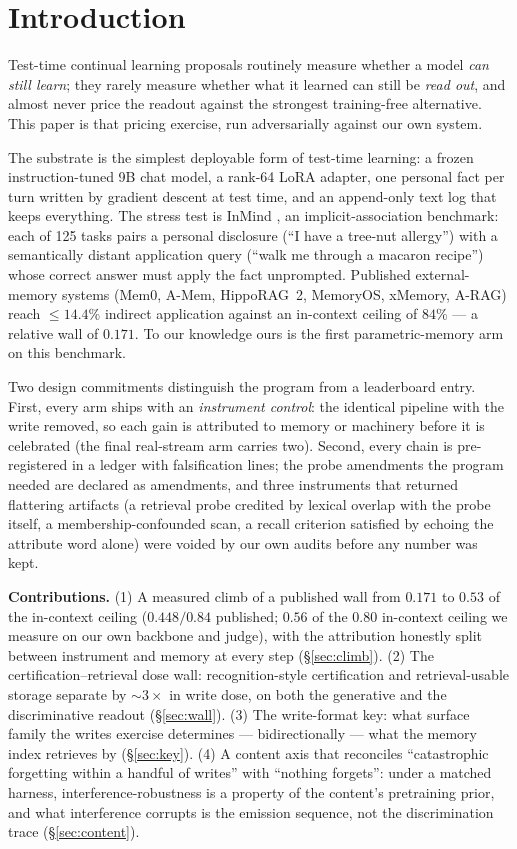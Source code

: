 \documentclass{article}
\begin{document}
\section{Introduction}

Test-time continual learning proposals routinely measure whether a model \emph{can still
learn}; they rarely measure whether what it learned can still be \emph{read out}, and almost
never price the readout against the strongest training-free alternative. This paper is that
pricing exercise, run adversarially against our own system.

The substrate is the simplest deployable form of test-time learning: a frozen
instruction-tuned 9B chat model, a rank-64 LoRA adapter, one personal fact per turn written
by gradient descent at test time, and an append-only text log that keeps everything. The
stress test is InMind \citep{inmind2026}, an implicit-association benchmark: each of 125
tasks pairs a personal disclosure (``I have a tree-nut allergy'') with a semantically
distant application query (``walk me through a macaron recipe'') whose correct answer must
apply the fact unprompted. Published external-memory systems (Mem0, A-Mem, HippoRAG~2,
MemoryOS, xMemory, A-RAG) reach $\le 14.4\%$ indirect application against an in-context
ceiling of $84\%$ --- a relative wall of $0.171$. To our knowledge ours is the first
parametric-memory arm on this benchmark.

Two design commitments distinguish the program from a leaderboard entry. First, every arm
ships with an \emph{instrument control}: the identical pipeline with the write removed, so
each gain is attributed to memory or machinery before it is celebrated (the final
real-stream arm carries two). Second, every chain is pre-registered in a ledger with falsification lines;
the probe amendments the program needed are declared as amendments, and three instruments
that returned flattering artifacts (a retrieval probe credited by lexical overlap with the
probe itself, a membership-confounded scan, a recall criterion satisfied by echoing the
attribute word alone) were voided by our own audits before any number was kept.

\textbf{Contributions.} (1) A measured climb of a published wall from $0.171$ to $0.53$ of
the in-context ceiling ($0.448/0.84$ published; $0.56$ of the $0.80$ in-context ceiling
we measure on our own backbone and judge), with
the attribution honestly split between instrument and memory at every step
(\S\ref{sec:climb}). (2) The certification--retrieval dose wall: recognition-style
certification and retrieval-usable storage separate by ${\sim}3\times$ in write dose, on
both the generative and the discriminative readout (\S\ref{sec:wall}). (3) The write-format
key: what surface family the writes exercise determines --- bidirectionally --- what the
memory index retrieves by (\S\ref{sec:key}). (4) A content axis that reconciles
``catastrophic forgetting within a handful of writes'' with ``nothing forgets'': under a matched harness,
interference-robustness is a property of the content's pretraining
prior, and what interference corrupts is the emission sequence, not the discrimination
trace (\S\ref{sec:content}).
\end{document}
